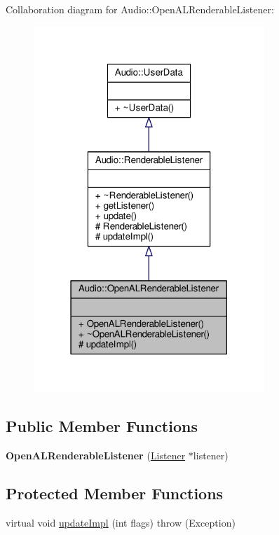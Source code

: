 Collaboration diagram for Audio\+:\+:Open\+A\+L\+Renderable\+Listener\+:
\nopagebreak
\begin{figure}[H]
\begin{center}
\leavevmode
\includegraphics[width=247pt]{d0/d44/classAudio_1_1OpenALRenderableListener__coll__graph}
\end{center}
\end{figure}
\subsection*{Public Member Functions}
\begin{DoxyCompactItemize}
\item 
{\bfseries Open\+A\+L\+Renderable\+Listener} (\hyperlink{classAudio_1_1Listener}{Listener} $\ast$listener)\hypertarget{classAudio_1_1OpenALRenderableListener_a65eb2fc7292df4dccb4ff3c1c0368110}{}\label{classAudio_1_1OpenALRenderableListener_a65eb2fc7292df4dccb4ff3c1c0368110}

\end{DoxyCompactItemize}
\subsection*{Protected Member Functions}
\begin{DoxyCompactItemize}
\item 
virtual void \hyperlink{classAudio_1_1OpenALRenderableListener_ae932bb6881351355c031aefcf81b0207}{update\+Impl} (int flags)  throw (\+Exception)
\end{DoxyCompactItemize}
